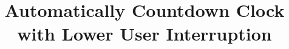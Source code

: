 \documentclass{sig-alternate-ipsn13}
\begin{document}
\title{Automatically Countdown Clock with Lower User Interruption}

%
%
%
%
%
\end{document}
